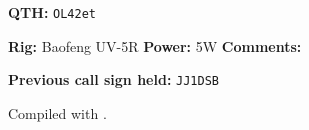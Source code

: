 \documentclass{article}
\begin{document}
\vfill

\footnotesize \textbf{QTH:}
     \texttt{OL42et} \,
\vfill

\footnotesize \textbf{Rig:} Baofeng UV-5R \makebox[0.1\textwidth]{} \textbf{Power:} 5W \makebox[0.1\textwidth]{} \textbf{Comments:}

\vfill

\footnotesize \textbf{Previous call sign held:} \texttt{JJ1DSB}

\vfill


\vfill

\tiny
\hfill Compiled with \textrm{\XeLaTeX}.
\end{document}
